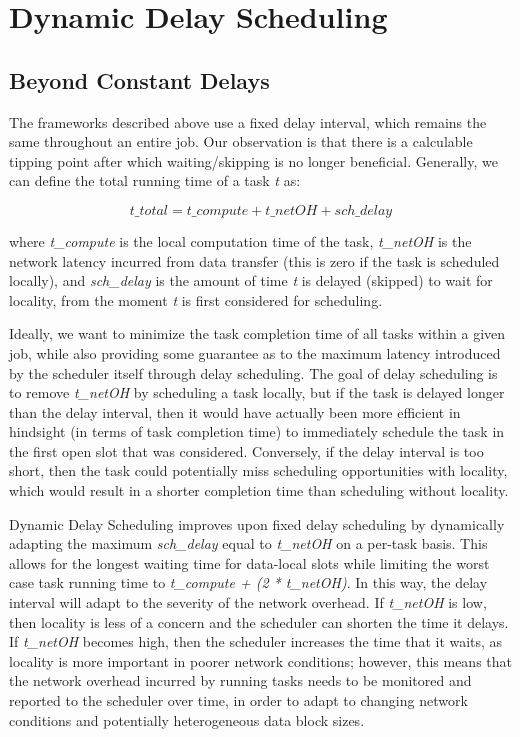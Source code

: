 \section{Dynamic Delay Scheduling}\label{sec:dynamic}

\subsection{Beyond Constant Delays}

The frameworks described above use a fixed delay interval, 
which remains the same throughout an entire job. Our observation is that there is a 
calculable tipping point after which waiting/skipping is no longer beneficial. Generally,
we can define the total running time of a task \textit{t} as:

\[
t\_total = t\_compute + t\_netOH + sch\_delay
\]

where \textit{t\_compute} is the local computation time of the task, \textit{t\_netOH}
is the network latency incurred from data transfer (this is zero if the task is scheduled 
locally), and \textit{sch\_delay} is the amount of time \textit{t} is delayed 
(skipped) to wait for locality, from the moment \textit{t} is first considered for 
scheduling.

Ideally, we want to minimize the task completion time of all tasks within a given job, 
while also providing some guarantee as to the maximum latency introduced by the scheduler
itself through delay scheduling. The goal of delay scheduling is to remove \textit{t\_netOH} by 
scheduling a task locally, but if the task is delayed longer than the delay interval, 
then it would have actually been more efficient in hindsight (in terms of task completion time) 
to immediately schedule the task in the first open slot that was considered. 
Conversely, if the delay interval is too short, then the task could potentially miss 
scheduling opportunities with locality, which would result in a shorter completion time
than scheduling without locality.

Dynamic Delay Scheduling improves upon fixed delay scheduling by dynamically adapting the maximum 
\textit{sch\_delay} equal to \textit{t\_netOH} on a per-task basis. This allows 
for the longest waiting time for data-local slots while limiting the worst case task 
running time to \textit{t\_compute + (2 * t\_netOH)}. In this way, the delay interval
will adapt to the severity of the network overhead. If \textit{t\_netOH} is low, then locality
is less of a concern and the scheduler can shorten the time it delays. If \textit{t\_netOH} becomes high,
then the scheduler increases the time that it waits, as locality is more important in poorer network
conditions; however, this means that the 
network overhead incurred by running tasks needs to be monitored and reported to the 
scheduler over time, in order to adapt to changing network conditions and potentially 
heterogeneous data block sizes. 

